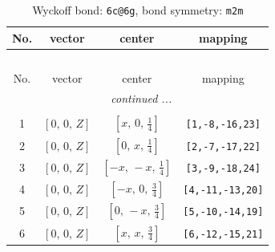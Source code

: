 \documentclass[fleqn,8pt]{jsarticle}
\begin{document}
\begin{longtable}{cccc}
\caption{Wyckoff bond: {\tt 6c@6g}, bond symmetry: {\tt m2m}}
 \\
 \hline \hline
No. & vector & center & mapping \\ \hline \endfirsthead

\multicolumn{3}{l}{\tablename\ \thetable{}} \\
 \hline \hline
No. & vector & center & mapping \\ \hline \endhead

 \hline \hline
\multicolumn{3}{r}{\footnotesize\it continued ...} \\ \endfoot

 \hline \hline
\multicolumn{3}{r}{} \\ \endlastfoot

1 & $\left[ 0,\, 0,\, Z \right]$ & $\left[ x,\, 0,\, \frac{1}{4} \right]$ & {\tt [1,-8,-16,23]} \\ \hline
2 & $\left[ 0,\, 0,\, Z \right]$ & $\left[ 0,\, x,\, \frac{1}{4} \right]$ & {\tt [2,-7,-17,22]} \\ \hline
3 & $\left[ 0,\, 0,\, Z \right]$ & $\left[ - x,\, - x,\, \frac{1}{4} \right]$ & {\tt [3,-9,-18,24]} \\ \hline
4 & $\left[ 0,\, 0,\, Z \right]$ & $\left[ - x,\, 0,\, \frac{3}{4} \right]$ & {\tt [4,-11,-13,20]} \\ \hline
5 & $\left[ 0,\, 0,\, Z \right]$ & $\left[ 0,\, - x,\, \frac{3}{4} \right]$ & {\tt [5,-10,-14,19]} \\ \hline
6 & $\left[ 0,\, 0,\, Z \right]$ & $\left[ x,\, x,\, \frac{3}{4} \right]$ & {\tt [6,-12,-15,21]} \\
\end{longtable}
\renewcommand{\arraystretch}{1.2}
\end{document}
